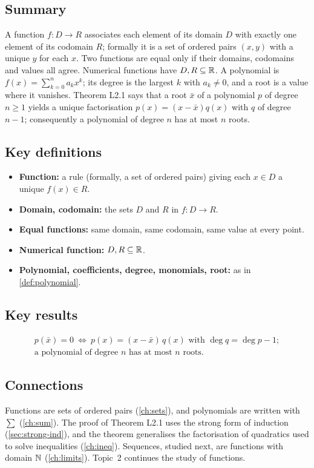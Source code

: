 \subsection*{Summary}
A function $f\colon D\to R$ associates each element of its domain $D$ with exactly one element of its codomain $R$;
formally it is a set of ordered pairs $(x,y)$ with a unique $y$ for each $x$. Two functions are equal only if their domains,
codomains and values all agree. Numerical functions have $D,R\subseteq\mathbb{R}$. A polynomial is
$f(x)=\sum_{k=0}^na_kx^k$; its degree is the largest $k$ with $a_k\ne0$, and a root is a value where it vanishes.
Theorem L2.1 says that a root $\bar x$ of a polynomial $p$ of degree $n\ge1$ yields a unique factorisation
$p(x)=(x-\bar x)q(x)$ with $q$ of degree $n-1$; consequently a polynomial of degree $n$ has at most $n$ roots.

\subsection*{Key definitions}
\begin{itemize}
  \item \textbf{Function:} a rule (formally, a set of ordered pairs) giving each $x\in D$ a unique $f(x)\in R$.
  \item \textbf{Domain, codomain:} the sets $D$ and $R$ in $f\colon D\to R$.
  \item \textbf{Equal functions:} same domain, same codomain, same value at every point.
  \item \textbf{Numerical function:} $D,R\subseteq\mathbb{R}$.
  \item \textbf{Polynomial, coefficients, degree, monomials, root:} as in \cref{def:polynomial}.
\end{itemize}

\subsection*{Key results}
\begin{gather*}
p(\bar x)=0\ \Longleftrightarrow\ p(x)=(x-\bar x)\,q(x)\text{ with }\deg q=\deg p-1;\\
\text{a polynomial of degree }n\text{ has at most }n\text{ roots.}
\end{gather*}

\subsection*{Connections}
Functions are sets of ordered pairs (\cref{ch:sets}), and polynomials are written with $\sum$ (\cref{ch:sum}). The proof of
Theorem L2.1 uses the strong form of induction (\cref{sec:strong-ind}), and the theorem generalises the factorisation of
quadratics used to solve inequalities (\cref{ch:ineq}). Sequences, studied next, are functions with domain $\mathbb{N}$
(\cref{ch:limits}). Topic~2 continues the study of functions.

